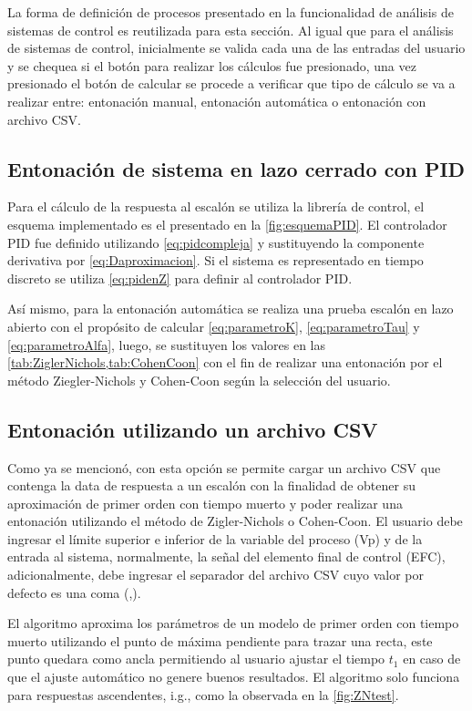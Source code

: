     La forma de definición de procesos presentado en la funcionalidad de análisis de sistemas de control es reutilizada para esta sección. Al igual que para el análisis de sistemas de control, inicialmente se valida cada una de las entradas del usuario y se chequea si el botón para realizar los cálculos fue presionado, una vez presionado el botón de calcular se procede a verificar que tipo de cálculo se va a realizar entre: entonación manual, entonación automática o entonación con archivo CSV.

    \subsection{Entonación de sistema en lazo cerrado con PID}
        
        Para el cálculo de la respuesta al escalón se utiliza la librería de control, el esquema implementado es el presentado en la \cref{fig:esquemaPID}. El controlador PID fue definido utilizando \cref{eq:pidcompleja} y sustituyendo la componente derivativa por \cref{eq:Daproximacion}. Si el sistema es representado en tiempo discreto se utiliza \cref{eq:pidenZ} para definir al controlador PID.
        
        Así mismo, para la entonación automática se realiza una prueba escalón en lazo abierto con el propósito de calcular \cref{eq:parametroK}, \cref{eq:parametroTau} y \cref{eq:parametroAlfa}, luego, se sustituyen los valores en las \cref{tab:ZiglerNichols,tab:CohenCoon} con el fin de realizar una entonación por el método Ziegler-Nichols y Cohen-Coon según la selección del usuario.

    \subsection{Entonación utilizando un archivo CSV}

        Como ya se mencionó, con esta opción se permite cargar un archivo CSV que contenga la data de respuesta a un escalón con la finalidad de obtener su aproximación de primer orden con tiempo muerto y poder realizar una entonación utilizando el método de Zigler-Nichols o Cohen-Coon. El usuario debe ingresar el límite superior e inferior de la variable del proceso (Vp) y de la entrada al sistema, normalmente, la señal del elemento final de control (EFC), adicionalmente, debe ingresar el separador del archivo CSV cuyo valor por defecto es una coma (,).

        El algoritmo aproxima los parámetros de un modelo de primer orden con tiempo muerto utilizando el punto de máxima pendiente para trazar una recta, este punto quedara como ancla permitiendo al usuario ajustar el tiempo $t_1$ en caso de que el ajuste automático no genere buenos resultados. El algoritmo solo funciona para respuestas ascendentes, i.g., como la observada en la \cref{fig:ZNtest}.

